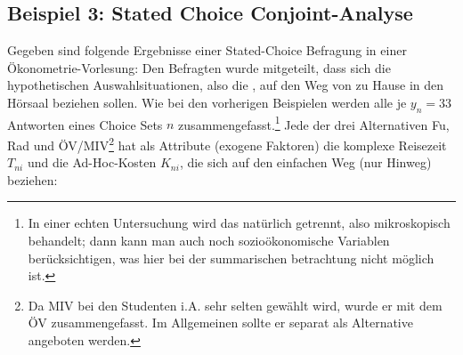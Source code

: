 \subsection{\label{sec:exampleConjoint}Beispiel 3: Stated Choice Conjoint-Analyse}

Gegeben sind folgende Ergebnisse einer Stated-Choice Befragung in
einer \"Okonometrie-Vorlesung: Den Befragten wurde mitgeteilt, dass
sich die hypothetischen Auswahlsituationen,
also die , auf den Weg von zu Hause in den
H\"orsaal beziehen sollen. Wie bei den vorherigen Beispielen werden
alle je $y_n=33$ Antworten eines Choice Sets $n$
zusammengefasst.\footnote{In einer echten Untersuchung wird das
  nat\"urlich getrennt, also mikroskopisch behandelt; dann kann man auch noch
  sozio\"okonomische Variablen ber\"ucksichtigen, was hier bei der
  summarischen betrachtung nicht m\"oglich ist.} Jede der drei Alternativen Fu\3, Rad und
\"OV/MIV\footnote{Da MIV bei den Studenten i.A. sehr selten gew\"ahlt
  wird, wurde er mit dem \"OV zusammengefasst. Im Allgemeinen sollte
  er separat als Alternative angeboten werden.} hat als Attribute
(exogene Faktoren) die komplexe Reisezeit $T_{ni}$ und die
Ad-Hoc-Kosten $K_{ni}$, die sich auf den einfachen Weg (nur Hinweg) beziehen:

